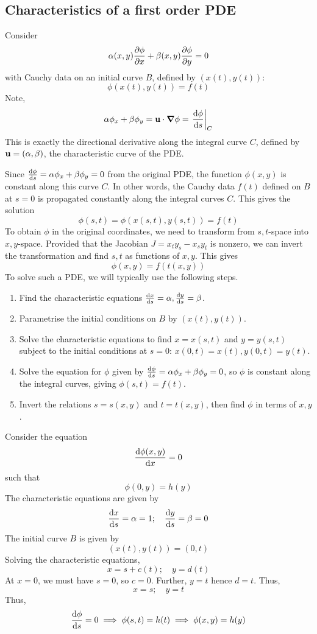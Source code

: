 \documentclass[a4paper]{article}
\begin{document}
\subsection{Characteristics of a first order PDE}
Consider
\[
	\alpha(x,y) \pdv{\phi}{x} + \beta(x,y) \pdv{\phi}{y} = 0
\]
with Cauchy data on an initial curve \( B \), defined by \( (x(t), y(t)) \):
\[
	\phi(x(t), y(t)) = f(t)
\]
Note,
\[
	\alpha \phi_x + \beta \phi_y = \bfu \cdot \grad{\phi} = \eval{\dv{\phi}{s}}_C
\]
This is exactly the directional derivative along the integral curve \( C \), defined by \( {\bf u} = (\alpha, \beta) \), the characteristic curve of the PDE. 

Since \( \dv{\phi}{s} = \alpha \phi_x + \beta \phi_y = 0 \) from the original PDE, the function \( \phi(x,y) \) is constant along this curve \( C \).
In other words, the Cauchy data \( f(t) \) defined on \( B \) at \( s = 0 \) is propagated constantly along the integral curves $ C $.
This gives the solution
\[
	\phi(s,t) = \phi(x(s,t), y(s,t)) = f(t)
\]
To obtain \( \phi \) in the original coordinates, we need to transform from \( s,t \)-space into \( x,y \)-space.
Provided that the Jacobian \( J = x_t y_s - x_s y_t \) is nonzero, we can invert the transformation and find \( s,t \) as functions of \( x,y \).
This gives
\[
	\phi(x,y) = f(t(x,y))
\]
To solve such a PDE, we will typically use the following steps.
\begin{enumerate}
	\item Find the characteristic equations \( \dv{x}{s} = \alpha, \dv{y}{s} = \beta \).
	\item Parametrise the initial conditions on \( B \) by \( (x(t), y(t)) \).
	\item Solve the characteristic equations to find \( x = x(s,t) \) and \( y = y(s,t) \) subject to the initial conditions at \( s = 0 \): $ x(0,t)=x(t), y(0,t)=y(t) $.
	\item Solve the equation for \( \phi \) given by \( \dv{\phi}{s} = \alpha \phi_x + \beta \phi_y = 0 \), so \( \phi \) is constant along the integral curves, giving \( \phi(s,t) = f(t) \).
	\item Invert the relations \( s = s(x,y) \) and \( t = t(x,y) \), then find \( \phi \) in terms of \( x,y \).
\end{enumerate}
\begin{example}
	Consider the equation
	\[
		\dv{\phi(x,y)}{x} = 0
	\]
	such that
	\[
		\phi(0,y) = h(y)
	\]
	The characteristic equations are given by
	\[
		\dv{x}{s} = \alpha = 1;\quad \dv{y}{s} = \beta = 0
	\]
	The initial curve \( B \) is given by
	\[
		(x(t), y(t)) = (0,t)
	\]
	Solving the characteristic equations,
	\[
		x = s + c(t);\quad y = d(t)
	\]
	At \( x = 0 \), we must have \( s = 0 \), so \( c = 0 \).
	Further, \( y = t \) hence \( d = t \).
	Thus,
	\[
		x = s;\quad y = t
	\]
	Thus,
	\[
		\dv{\phi}{s} = 0 \implies \phi(s,t) = h(t) \implies \phi(x,y) = h(y)
	\]
\end{example}
\end{document}

